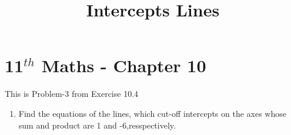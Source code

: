 \documentclass[12pt]{article}
\begin{document}
\begin{center}
\title{\textbf{ Intercepts Lines}}
\date{\vspace{-5ex}} %
\maketitle
\end{center}
\setcounter{page}{1}
\section*{11$^{th}$ Maths - Chapter 10}
This is Problem-3 from Exercise 10.4
\begin{enumerate}
\item Find the equations of the lines, which cut-off intercepts on the axes whose sum and product are 1 and -6,resspectively.

\end{enumerate}
\end{document}
